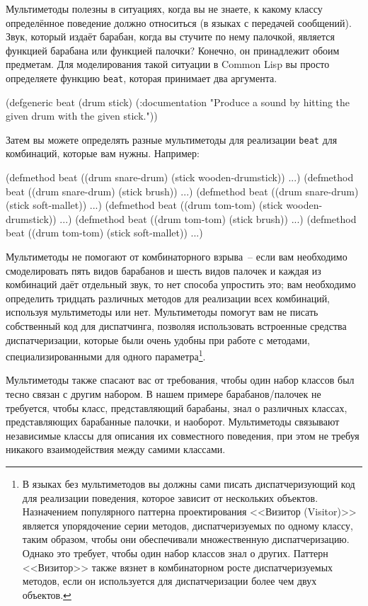 Мультиметоды полезны в ситуациях, когда вы не знаете, к какому классу определённое
поведение должно относиться (в языках с передачей сообщений).  Звук, который издаёт
барабан, когда вы стучите по нему палочкой, является функцией барабана или функцией
палочки?  Конечно, он принадлежит обоим предметам.  Для моделирования такой ситуации в
Common Lisp вы просто определяете функцию \lstinline{beat}, которая принимает два аргумента.

\begin{myverb}
(defgeneric beat (drum stick)
  (:documentation
   "Produce a sound by hitting the given drum with the given stick."))
\end{myverb}

Затем вы можете определять разные мультиметоды для реализации \lstinline{beat} для комбинаций,
которые вам нужны. Например:

\begin{myverb}
(defmethod beat ((drum snare-drum) (stick wooden-drumstick)) ...)
(defmethod beat ((drum snare-drum) (stick brush)) ...)
(defmethod beat ((drum snare-drum) (stick soft-mallet)) ...)
(defmethod beat ((drum tom-tom) (stick wooden-drumstick)) ...)
(defmethod beat ((drum tom-tom) (stick brush)) ...)
(defmethod beat ((drum tom-tom) (stick soft-mallet)) ...)
\end{myverb}

Мультиметоды не помогают от комбинаторного взрыва~-- если вам необходимо смоделировать
пять видов барабанов и шесть видов палочек и каждая из комбинаций даёт отдельный звук, то
нет способа упростить это; вам необходимо определить тридцать различных методов для
реализации всех комбинаций, используя мультиметоды или нет.  Мультиметоды помогут вам не
писать собственный код для диспатчинга, позволяя использовать встроенные средства
диспатчеризации, которые были очень удобны при работе с методами, специализированными для
одного параметра\footnote{В языках без мультиметодов вы должны сами писать
  диспатчеризующий код для реализации поведения, которое зависит от нескольких объектов.
  Назначением популярного паттерна проектирования <<Визитор (Visitor)>> является
  упорядочение серии методов, диспатчеризуемых по одному классу, таким образом, чтобы они
  обеспечивали множественную диспатчеризацию.  Однако это требует, чтобы один набор
  классов знал о других.  Паттерн <<Визитор>> также вязнет в комбинаторном росте
  диспатчеризуемых методов, если он используется для диспатчеризации более чем двух
  объектов.}.

Мультиметоды также спасают вас от требования, чтобы один набор классов был тесно связан с
другим набором. В нашем примере барабанов/палочек не требуется, чтобы класс,
представляющий барабаны, знал о различных классах, представляющих барабанные палочки, и
наоборот.  Мультиметоды связывают независимые классы для описания их совместного
поведения, при этом не требуя никакого взаимодействия между самими классами.


